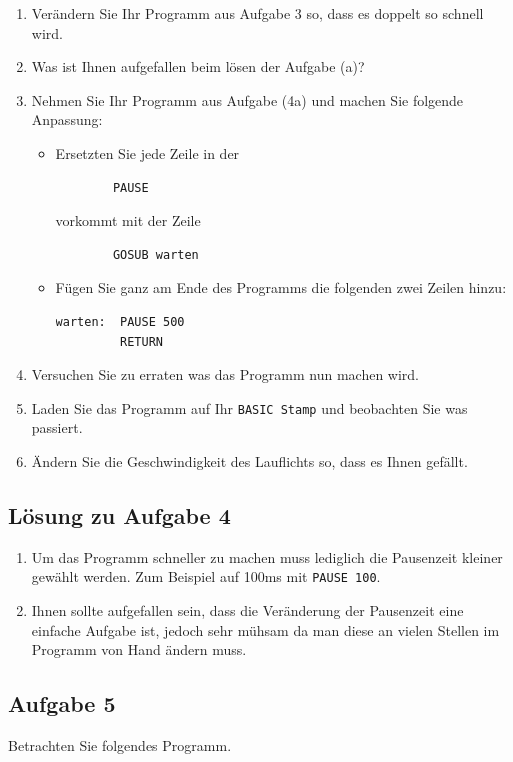 \begin{enumerate}[label=(\alph*)]
	\item Verändern Sie Ihr Programm aus Aufgabe 3 so, dass es doppelt
	so schnell wird.
	\item Was ist Ihnen aufgefallen beim lösen der Aufgabe (a)?
	\item Nehmen Sie Ihr Programm aus Aufgabe (4a) und machen Sie folgende
	Anpassung:\\
	\begin{itemize}
		\item Ersetzten Sie jede Zeile in der 
		\begin{lstlisting}
		PAUSE
		\end{lstlisting}
		vorkommt mit der Zeile
		\begin{lstlisting}
		GOSUB warten
		\end{lstlisting}
		\item Fügen Sie ganz am Ende des Programms die folgenden 
		zwei Zeilen hinzu:
		\begin{lstlisting}
warten:  PAUSE 500
         RETURN
		\end{lstlisting}
	\end{itemize}
	\item Versuchen Sie zu erraten was das Programm nun machen wird.
	\item Laden Sie das Programm auf Ihr \verb!BASIC Stamp! und beobachten
	Sie was passiert.
	\item Ändern Sie die Geschwindigkeit des Lauflichts so, dass es 
	Ihnen gefällt.
\end{enumerate}

\ifteacher
\newpage
\subsection{Lösung zu Aufgabe 4}
\begin{enumerate}[label=(\alph*)]
	\item Um das Programm schneller zu machen muss lediglich die Pausenzeit
	kleiner gewählt werden. Zum Beispiel auf 100ms mit
	\lstinline{PAUSE 100}.
	\item Ihnen sollte aufgefallen sein, dass die Veränderung der Pausenzeit
	eine einfache Aufgabe ist, jedoch sehr mühsam da man diese an vielen 
	Stellen im Programm von Hand ändern muss.


\end{enumerate}
\fi

\newpage
\subsection{Aufgabe 5}
Betrachten Sie folgendes Programm.

